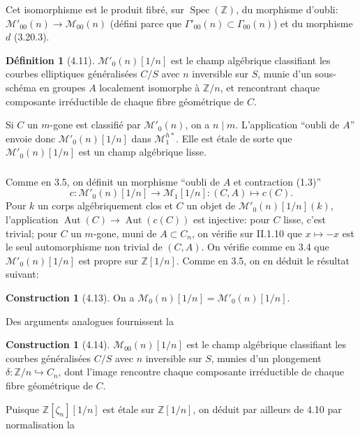 \documentclass[11pt,a4paper]{amsart}
\theoremstyle{plain}
\theoremstyle{definition}
\newtheorem{definition}[theorem]{D\'efinition}
\newtheorem{construction}[theorem]{Construction}
\DeclareMathOperator{\Aut}{Aut}
\DeclareMathOperator{\Spec}{Spec}
\newcommand{\mll}{\mathcal{M}}
\newcommand{\ZZ}{\mathbb{Z}}
\begin{document}
Cet isomorphisme est le produit fibr\'e, sur $\Spec(\ZZ)$, du morphisme d'oubli: $\mll'_{00}(n) \to \mll_{00}(n)$ (d\'efini parce que $\Gamma'_{00}(n) \subset \Gamma_{00}(n)$) et du morphisme $d$ (3.20.3).

\begin{definition}[4.11]
$\mll'_0(n)[1/n]$ est le champ alg\'ebrique classifiant les courbes elliptiques g\'en\'eralis\'ees $C/S$ avec $n$ inversible sur $S$, munie d'un sous-sch\'ema en groupes $A$ localement isomorphe \`a $\ZZ/n$, et rencontrant chaque composante irr\'eductible de chaque fibre g\'eom\'etrique de $C$.
\end{definition}

Si $C$ un $m$-gone est classifi\'e par $\mll'_0(n)$, on a $n \mid m$. L'application ``oubli de $A$'' envoie donc $\mll'_0(n)[1/n]$ dans $\mll^{h*}_1$. Elle est \'etale de sorte que $\mll'_0(n)[1/n]$ est un champ alg\'ebrique lisse.

\subsubsection{}
Comme en 3.5, on d\'efinit un morphisme ``oubli de $A$ et contraction (1.3)''
\[
c \colon \mll'_0(n)[1/n] \longrightarrow \mll_1[1/n] \colon (C,A) \mapsto c(C).
\]
Pour $k$ un corps alg\'ebriquement clos et $C$ un objet de $\mll'_0(n)[1/n](k)$, l'application $\Aut(C) \to \Aut(c(C))$ est injective: pour $C$ lisse, c'est trivial; pour $C$ un $m$-gone, muni de $A \subset C_n$, on v\'erifie sur II.1.10 que $x \mapsto -x$ est le seul automorphisme non trivial de $(C,A)$. On v\'erifie comme en 3.4 que $\mll'_0(n)[1/n]$ est propre sur $\ZZ[1/n]$. Comme en 3.5, on en d\'eduit le r\'esultat suivant:

\begin{construction}[4.13]
On a $\mll_0(n)[1/n] = \mll'_0(n)[1/n]$.
\end{construction}

Des arguments analogues fournissent la

\begin{construction}[4.14]
$\mll_{00}(n)[1/n]$ est le champ alg\'ebrique classifiant les courbes g\'en\'eralis\'ees $C/S$ avec $n$ inversible sur $S$, munies d'un plongement $\delta \colon \ZZ/n \hookrightarrow C_n$, dont l'image rencontre chaque composante irr\'eductible de chaque fibre g\'eom\'etrique de $C$.
\end{construction}

Puisque $\ZZ[\zeta_n][1/n]$ est \'etale sur $\ZZ[1/n]$, on d\'eduit par ailleurs de 4.10 par normalisation la
\end{document}
